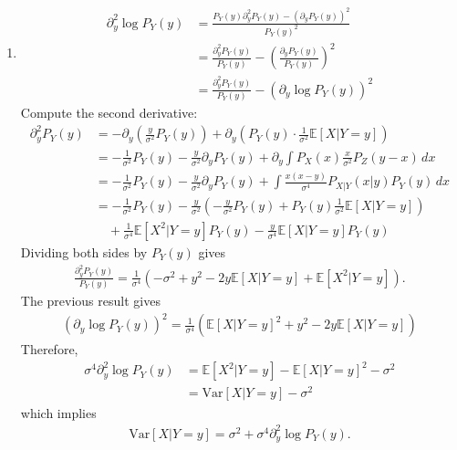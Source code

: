 \documentclass[12pt]{article}
\newcommand{\fE}{\mathbb{E}}
\renewcommand{\Var}[1]{\mathrm{Var}\left[#1\right]}
\begin{document}
\begin{enumerate}
\begin{solution}
\begin{enumerate}
    \item
    \begin{align}
        \partial_y^2 \log P_Y(y)
        &= \frac{P_Y(y)\partial_y^2 P_Y(y)-(\partial_y P_Y(y))^2}{P_Y(y)^2} \\
        &= \frac{\partial_y^2 P_Y(y)}{P_Y(y)} - \left(\frac{\partial_y P_Y(y)}{P_Y(y)}\right)^2 \\
        &= \frac{\partial_y^2 P_Y(y)}{P_Y(y)} - \left(\partial_y \log P_Y(y)\right)^2
    \end{align}
    Compute the second derivative:
    \begin{align}
        \partial_y^2 P_Y(y) 
        &= -\partial_y \left(\frac{y}{\sigma^2} P_Y(y)\right) + \partial_y \left(P_Y(y) \cdot \frac{1}{\sigma^2} \fE[X | Y = y]\right) \\
        &= -\frac{1}{\sigma^2} P_Y(y) - \frac{y}{\sigma^2} \partial_y P_Y(y) + \partial_y \int P_X(x) \frac{x}{\sigma^2} P_Z(y - x)\, dx \\
        &= -\frac{1}{\sigma^2} P_Y(y) - \frac{y}{\sigma^2} \partial_y P_Y(y) + \int \frac{x(x - y)}{\sigma^4} P_{X|Y}(x | y) P_Y(y)\, dx \\
        &= -\frac{1}{\sigma^2} P_Y(y) - \frac{y}{\sigma^2} \left(-\frac{y}{\sigma^2} P_Y(y) + P_Y(y) \frac{1}{\sigma^2} \fE[X | Y = y]\right) \\
        &\quad + \frac{1}{\sigma^4} \fE[X^2 | Y = y] P_Y(y) - \frac{y}{\sigma^4} \fE[X | Y = y] P_Y(y)
    \end{align}
    Dividing both sides by $P_Y(y)$ gives
    \begin{align}
        \frac{\partial_y^2 P_Y(y)}{P_Y(y)} 
        = \frac{1}{\sigma^4} \left(-\sigma^2 + y^2 - 2y \fE[X | Y = y] + \fE[X^2 | Y = y]\right).
    \end{align}
    The previous result gives
    \begin{align}
        \left(\partial_y \log P_Y(y)\right)^2 
        = \frac{1}{\sigma^4} \left( \fE[X | Y = y]^2 + y^2 - 2y \fE[X | Y = y] \right)
    \end{align}
    Therefore,
    \begin{align}
        \sigma^4 \partial_y^2 \log P_Y(y) 
        &= \fE[X^2 | Y = y] - \fE[X | Y = y]^2 - \sigma^2 \\
        &= \Var{X | Y = y} - \sigma^2
    \end{align}
    which implies
    \begin{align}
        \Var{X | Y = y} = \sigma^2 + \sigma^4 \partial_y^2 \log P_Y(y).
    \end{align}
\end{enumerate}
\end{solution}



\end{enumerate}
\end{document}
